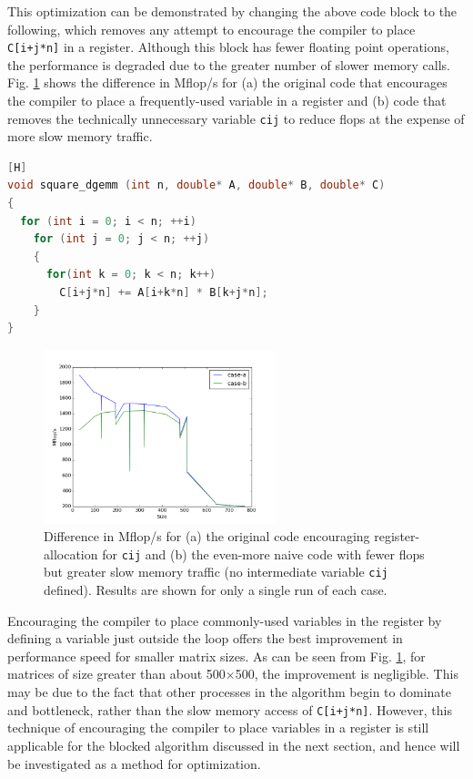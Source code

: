 \documentclass[10pt]{article}
\begin{document}
This optimization can be demonstrated by changing the above code block to the following, which removes any attempt to encourage the compiler to place {\tt C[i+j*n]} in a register. Although this block has fewer floating point operations, the performance is degraded due to the greater number of slower memory calls. Fig. \ref{fig:1} shows the difference in Mflop/s for (a) the original code that encourages the compiler to place a frequently-used variable in a register and (b) code that removes the technically unnecessary variable {\tt cij} to reduce flops at the expense of more slow memory traffic.

\begin{lstlisting}[language=C][H]
void square_dgemm (int n, double* A, double* B, double* C)
{
  for (int i = 0; i < n; ++i)
    for (int j = 0; j < n; ++j)
    {
      for(int k = 0; k < n; k++)
        C[i+j*n] += A[i+k*n] * B[k+j*n];
    }
}
\end{lstlisting}

\begin{figure}[H]
\centering
\includegraphics[width=0.6\textwidth]{fig1.png}
\caption{Difference in Mflop/s for (a) the original code encouraging register-allocation for {\tt cij} and (b) the even-more naive code with fewer flops but greater slow memory traffic (no intermediate variable {\tt cij} defined). Results are shown for only a single run of each case.}
\label{fig:1}
\end{figure}

Encouraging the compiler to place commonly-used variables in the register by defining a variable just outside the loop offers the best improvement in performance speed for smaller matrix sizes. As can be seen from Fig. \ref{fig:1}, for matrices of size greater than about 500\(\times\)500, the improvement is negligible. This may be due to the fact that other processes in the algorithm begin to dominate and bottleneck, rather than the slow memory access of {\tt C[i+j*n]}. However, this technique of encouraging the compiler to place variables in a register is still applicable for the blocked algorithm discussed in the next section, and hence will be investigated as a method for optimization.
\end{document}
